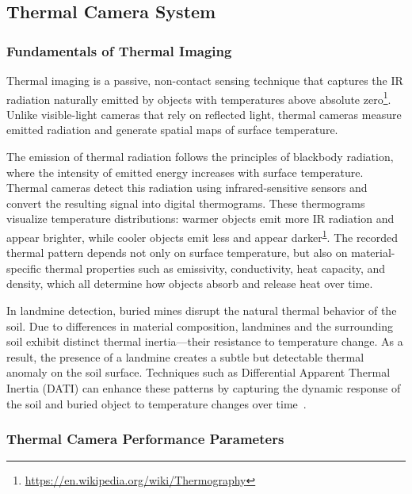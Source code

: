 \subsection{Thermal Camera System}\label{thermal_system}

\subsubsection{Fundamentals of Thermal Imaging}\label{thermal_fundamental}

Thermal imaging is a passive, non-contact sensing technique that captures the \gls{IR} radiation naturally emitted by objects with temperatures above absolute zero\footnote{\label{thermography}\url{https://en.wikipedia.org/wiki/Thermography}}. Unlike visible-light cameras that rely on reflected light, thermal cameras measure emitted radiation and generate spatial maps of surface temperature.

The emission of thermal radiation follows the principles of blackbody radiation, where the intensity of emitted energy increases with surface temperature. Thermal cameras detect this radiation using infrared-sensitive sensors and convert the resulting signal into digital thermograms. These thermograms visualize temperature distributions: warmer objects emit more \gls{IR} radiation and appear brighter, while cooler objects emit less and appear darker\textsuperscript{\ref{thermography}}. The recorded thermal pattern depends not only on surface temperature, but also on material-specific thermal properties such as emissivity, conductivity, heat capacity, and density, which all determine how objects absorb and release heat over time.

In landmine detection, buried mines disrupt the natural thermal behavior of the soil. Due to differences in material composition, landmines and the surrounding soil exhibit distinct thermal inertia—their resistance to temperature change. As a result, the presence of a landmine creates a subtle but detectable thermal anomaly on the soil surface. Techniques such as Differential Apparent Thermal Inertia (DATI) can enhance these patterns by capturing the dynamic response of the soil and buried object to temperature changes over time~\cite{nikulin2018detection}.



\subsubsection{Thermal Camera Performance Parameters}\label{thermal_parameter}

